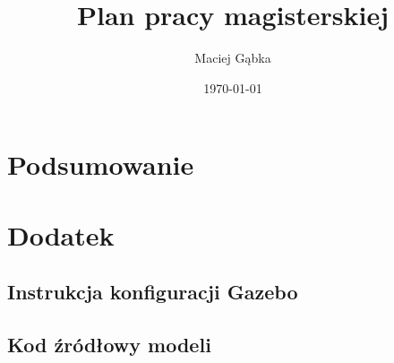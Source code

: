 \documentclass[12pt,onecolumn,a4paper,draft,notitlepage]{report}
\title{Plan pracy magisterskiej}
\author{Maciej Gąbka}
\date{\today}
\begin{document}
\maketitle

\tableofcontents



















\chapter{Podsumowanie}

\chapter{Dodatek}
\section{Instrukcja konfiguracji Gazebo}
\section{Kod źródłowy modeli}


\end{document}
